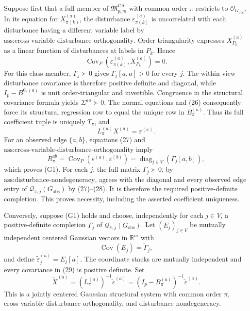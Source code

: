 Suppose first that a full member of \(\mathfrak M_{p,m}^{\mathrm{CA}}\) with common order \(\pi\) restricts to \(\mathcal O_{G_{\mathrm{obs}}}\).  In its equation for \(X_{\pi(k)}^{(a)}\), the disturbance \(\varepsilon_{\pi(k)}^{(a)}\) is uncorrelated with each disturbance having a different variable label by \(\text{ass:cross-variable-disturbance-orthogonality}\).  Order triangularity expresses \(X_{P_k}^{(a)}\) as a linear function of disturbances at labels in \(P_k\).  Hence
\[
\operatorname{Cov}_P\!\left(\varepsilon_{\pi(k)}^{(a)},X_{P_k}^{(a)}\right)=0.
\tag{26}
\]
For this class member, \(\Gamma_j\succ0\) gives \(\Gamma_j[a,a]>0\) for every \(j\).  The within-view disturbance covariance is therefore positive definite and diagonal, while \(I_p-B^{0,(a)}\) is unit order-triangular and invertible.  Congruence in the structural covariance formula yields \(\Sigma^{aa}\succ0\).  The normal equations and (26) consequently force its structural regression row to equal the unique row in \(B_\pi^{(a)}\).  Thus its full coefficient tuple is uniquely \(T_\pi\), and
\[
L_\pi^{(a)}X^{(a)}=\varepsilon^{(a)}.
\tag{27}
\]
For an observed edge \(\{a,b\}\), equations (27) and \(\text{ass:cross-variable-disturbance-orthogonality}\) imply
\[
R_\pi^{ab}
=\operatorname{Cov}_P(\varepsilon^{(a)},\varepsilon^{(b)})
=\operatorname{diag}_{j\in V}(\Gamma_j[a,b]),
\tag{28}
\]
which proves (G1).  For each \(j\), the full matrix \(\Gamma_j\succ0\), by \(\text{ass:disturbance-nondegeneracy}\), agrees with the diagonal and every observed edge entry of \(\mathcal Q_{\pi,j}(G_{\mathrm{obs}})\) by (27)--(28).  It is therefore the required positive-definite completion.  This proves necessity, including the asserted coefficient uniqueness.

Conversely, suppose (G1) holds and choose, independently for each \(j\in V\), a positive-definite completion \(\widetilde\Gamma_j\) of \(\mathcal Q_{\pi,j}(G_{\mathrm{obs}})\).  Let \((E_j)_{j\in V}\) be mutually independent centered Gaussian vectors in \(\mathbb R^m\) with
\[
\operatorname{Cov}(E_j)=\widetilde\Gamma_j,
\tag{29}
\]
and define \(\widetilde\varepsilon_j^{(a)}=E_j[a]\).  The coordinate stacks are mutually independent and every covariance in (29) is positive definite.  Set
\[
\widetilde X^{(a)}=(L_\pi^{(a)})^{-1}\widetilde\varepsilon^{(a)}
=(I_p-B_\pi^{(a)})^{-1}\widetilde\varepsilon^{(a)}.
\tag{30}
\]
This is a jointly centered Gaussian structural system with common order \(\pi\), cross-variable disturbance orthogonality, and disturbance nondegeneracy.

